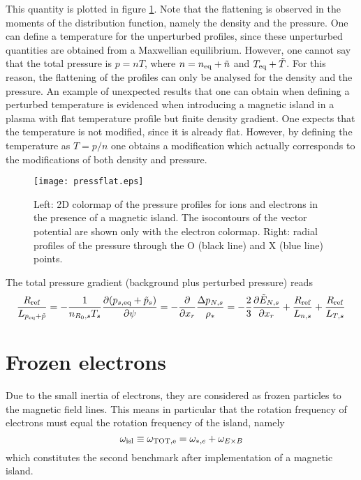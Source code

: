 This quantity is plotted in figure \ref{fig:pressureflat}. Note that the flattening is observed in the moments of the distribution function, namely the density and the pressure. One can define a temperature for the unperturbed profiles, since these unperturbed quantities are obtained from a Maxwellian equilibrium. However, one cannot say that the total pressure is $p=nT$, where $n=n_{\rm eq} + \tilde{n}$ and $T_{\rm eq} + \tilde{T}$. For this reason, the flattening of the profiles can only be analysed for the density and the pressure. An example of unexpected results that one can obtain when defining a perturbed temperature is evidenced when introducing a magnetic island in a plasma with flat temperature profile but finite density gradient. One expects that the temperature is not modified, since it is already flat. However, by defining the temperature as $T=p/n$ one obtains a modification which actually corresponds to the modifications of both density and pressure.

\begin{figure}
\begin{center}
\texttt{[image: pressflat.eps]}
\caption{Left: 2D colormap of the pressure profiles for ions and electrons in the presence of a magnetic island. The isocontours of the vector potential are shown only with the electron colormap. Right: radial profiles of the pressure through the O (black line) and X (blue line) points.}
\label{fig:pressureflat}
\end{center}
\end{figure}

The total pressure gradient (background plus perturbed pressure) reads
\begin{equation}
{R_{\rm ref} \over L_{p_{\rm eq}+\tilde{p}}}  =  -{1 \over n_{R_0,s}T_s} {\partial (p_{s,\rm eq}+\tilde{p}_s) \over \partial \psi} = -{\partial\over\partial x_r}{\Delta p_{N,s} \over \rho_*} = 
 -{2\over 3}{\partial\tilde E_{N,s}\over\partial x_r} + {R_{\rm ref} \over L_{n,s}} + {R_{\rm ref} \over L_{T,s}}
\end{equation}

\section{Frozen electrons}

Due to the small inertia of electrons, they are considered as frozen particles to the magnetic field lines. This means in particular that the rotation frequency of electrons must equal the rotation
frequency of the island, namely
\begin{equation}
\omega_{\rm isl}\equiv\omega_{\rm TOT,e} = \omega_{*,e} + \omega_{E\times B}
\end{equation}
which constitutes the second benchmark after implementation of a magnetic island.

